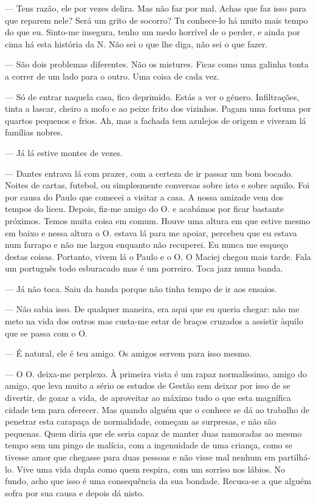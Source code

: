 --- Tens razão, ele por vezes delira. Mas não faz por mal. Achas que faz
  isso para que reparem nele? Será um grito de socorro? Tu conhece-lo há
  muito mais tempo do que eu. Sinto-me insegura, tenho um medo horrível
  de o perder, e ainda por cima há esta história da N. Não sei o que lhe
  diga, não sei o que fazer.

--- São dois problemas diferentes. Não os mistures. Ficas como uma galinha
  tonta a correr de um lado para o outro. Uma coisa de cada vez.


\medskip
\asterisc
\medskip

--- Só de entrar naquela casa, fico deprimido. Estás a ver o género.
  Infiltrações, tinta a lascar, cheiro a mofo e ao peixe frito dos
  vizinhos. Pagam uma fortuna por quartos pequenos e frios. Ah, mas a
  fachada tem azulejos de origem e viveram lá famílias nobres.


--- Já lá estive montes de vezes.

--- Dantes entrava lá com prazer, com a certeza de ir passar um bom
  bocado. Noites de cartas, futebol, ou simplesmente conversas sobre
  isto e sobre aquilo. Foi por causa do Paulo que comecei a visitar a
  casa. A nossa amizade vem dos tempos do liceu. Depois, fiz-me amigo do
  O. e acabámos por ficar bastante próximos. Temos muita coisa em comum.
  Houve uma altura em que estive mesmo em baixo e nessa altura o O.
  estava lá para me apoiar, percebeu que eu estava num farrapo e não me
  largou enquanto não recuperei. Eu nunca me esqueço destas coisas.
  Portanto, vivem lá o Paulo e o O. O Maciej chegou mais tarde. Fala um
  português todo esburacado mas é um porreiro. Toca jazz numa banda.

--- Já não toca. Saiu da banda porque não tinha tempo de ir aos ensaios.

--- Não sabia isso. De qualquer maneira, era aqui que eu queria chegar:
  não me meto na vida dos outros mas custa-me estar de braços cruzados a
  assistir àquilo que se passa com o O.

--- É natural, ele é teu amigo. Os amigos servem para isso mesmo.

--- O O. deixa-me perplexo. À primeira vista é um rapaz normalíssimo,
  amigo do amigo, que leva muito a sério os estudos de Gestão sem deixar
  por isso de se divertir, de gozar a vida, de aproveitar ao máximo tudo
  o que esta magnífica cidade tem para oferecer. Mas quando alguém que o
  conhece se dá ao trabalho de penetrar esta carapaça de normalidade,
  começam as surpresas, e não são pequenas. Quem diria que ele seria
  capaz de manter duas namoradas ao mesmo tempo sem um pingo de malícia,
  com a ingenuidade de uma criança, como se tivesse amor que chegasse
  para duas pessoas e não visse mal nenhum em partilhá-lo. Vive uma vida
  dupla como
quem respira, com um sorriso nos lábios. No fundo, acho que isso é uma
consequência da sua bondade. Recusa-se a que alguém sofra por sua
causa e depois dá nisto.

